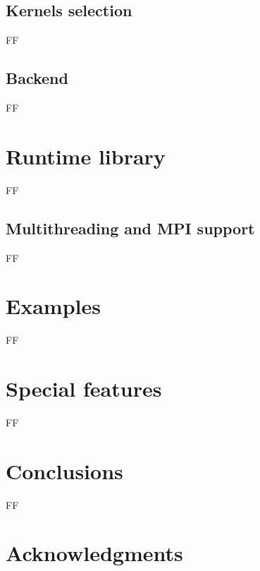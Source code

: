 \documentclass[a4,12pt]{article}
\begin{document}
\subsection{Kernels selection}

FF

\subsection{Backend}

FF

\section{Runtime library}

FF

\subsection{Multithreading and MPI support}

FF

\section{Examples}

FF

\section{Special features}

FF

\section{Conclusions}

FF

\section{Acknowledgments}
\end{document}

